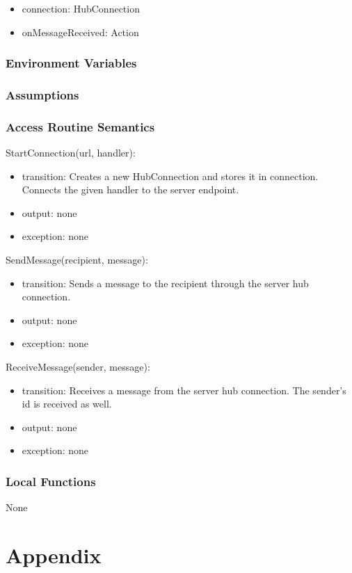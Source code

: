 \documentclass[12pt, titlepage]{article}
\begin{document}
\begin{itemize}
\item connection: HubConnection
\item onMessageReceived: Action
\end{itemize}

\subsubsection{Environment Variables}

\subsubsection{Assumptions}

\subsubsection{Access Routine Semantics}

\noindent StartConnection(url, handler):
\begin{itemize}
\item transition: Creates a new HubConnection and stores it in connection. Connects the given handler to the server endpoint.
\item output: none
\item exception: none
\end{itemize}

\noindent SendMessage(recipient, message):
\begin{itemize}
\item transition: Sends a message to the recipient through the server hub connection.
\item output: none
\item exception: none
\end{itemize}

\noindent ReceiveMessage(sender, message):
\begin{itemize}
\item transition: Receives a message from the server hub connection. The sender's id is received as well.
\item output: none
\item exception: none
\end{itemize}

\subsubsection{Local Functions}

None

\newpage

\section{Appendix} \label{Appendix}

\end{document}

